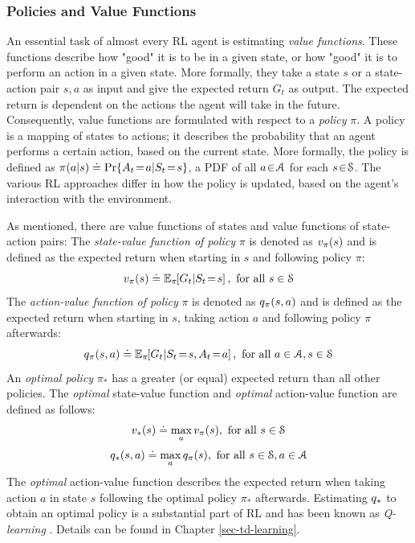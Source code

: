\documentclass[a4paper, twoside, 12pt]{article}
\let\cite\shortcite
\begin{document}
\subsubsection{Policies and Value Functions}
\label{sec:org2ef2318}
An essential task of almost every RL agent is estimating \emph{value functions}.
These functions describe how "good" it is to be in a given state, or how "good"
it is to perform an action in a given state. More formally, they take a state
\(s\) or a state-action pair \(s,a\) as input and give the expected return \(G_t\) as
output. The expected return is dependent on the actions the agent will take in
the future. Consequently, value functions are formulated with respect to a
\emph{policy} \(\pi\). A policy is a mapping of states to actions; it describes the
probability that an agent performs a certain action, based on the current state.
More formally, the policy is defined as
\(\pi(a|s)\defeq\Pr{A_t\!=\!a|S_t\!=\!s}\), a PDF of all \(a\!\in\!\A\) for each
\(s\!\in\!\S\). The various RL approaches differ in how the policy is
updated, based on the agent's interaction with the environment.

As mentioned, there are value functions of states and value functions of
state-action pairs: The \emph{state-value function of policy} \(\pi\) is denoted as
\(\vpi(s)\) and is defined as the expected return when starting in \(s\) and
following policy \(\pi\):
\begin{equation} \label{eq-state-value}
    \vpi(s) \defeq \EE{\pi}{G_t|S_t\!=\!s}, \text{ for all } s\in\S
\end{equation}
The \emph{action-value function of policy} \(\pi\) is denoted as \(\qpi(s,a)\) and is
defined as the expected return when starting in \(s\), taking action \(a\) and
following policy \(\pi\) afterwards:
\begin{equation} \label{eq-action-value}
    \qpi(s,a) \defeq \EE{\pi}{G_t|S_t\!=\!s, A_t\!=\!a}, \text{ for all } a\in\A, s\in\S
\end{equation}
An \emph{optimal policy} \(\pi_*\) has a greater (or equal) expected return than all
other policies.  The \emph{optimal} state-value function and \emph{optimal} action-value
function are defined as follows:
\begin{equation}
    \vstar(s) \defeq \max_a \vpi(s), \text{ for all } s\in\S
\end{equation}
\begin{equation}
    \qstar(s,a) \defeq \max_a \qpi(s), \text{ for all } s\in\S, a\in\A
\end{equation}
The \emph{optimal} action-value function describes the expected return when taking
action \(a\) in state \(s\) following the optimal policy \(\pi_*\) afterwards.
Estimating \(\qstar\) to obtain an optimal policy is a substantial part of RL and
has been known as \emph{Q-learning} \cite{watkins92_q_learn}. Details can be found in
Chapter \ref{sec-td-learning}.
\end{document}
